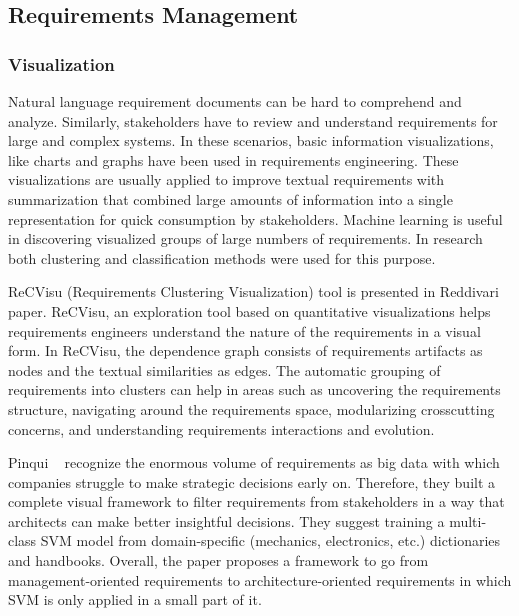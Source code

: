 \subsection{Requirements Management}

\subsubsection{Visualization}

Natural language requirement documents can be hard to comprehend and analyze. Similarly, stakeholders have to review and understand requirements for large and complex systems.  In these scenarios, basic information visualizations, like charts and graphs have been used in requirements engineering. These visualizations are usually applied to improve textual requirements with summarization that combined large amounts of information into a single representation for quick consumption by stakeholders\cite{Reddivari:2012}. Machine learning is useful in discovering visualized groups of large numbers of requirements. In research both clustering and classification methods were used for this purpose.

ReCVisu (Requirements Clustering Visualization) tool is presented in Reddivari
\etal~\cite{Reddivari:2012} paper. ReCVisu, an exploration tool based on
quantitative visualizations helps requirements engineers understand the nature
of the requirements in a visual form. In ReCVisu, the dependence graph consists
of requirements artifacts as nodes and the textual similarities as edges. The
automatic grouping of requirements into clusters can help in areas such as
uncovering the requirements structure, navigating around the requirements space,
modularizing crosscutting concerns, and understanding requirements interactions
and evolution.

	Pinqui \etal~\cite{Pinqui:2015} recognize the enormous volume of requirements as
big data with which companies struggle to make strategic decisions early on.
Therefore, they built a complete visual framework to filter requirements from
stakeholders in a way that architects can make better insightful decisions. They
suggest training a multi-class SVM model from domain-specific (mechanics,
electronics, etc.) dictionaries and handbooks. Overall, the paper proposes a
framework to go from management-oriented requirements to architecture-oriented
requirements in which SVM is only applied in a small part of it.

